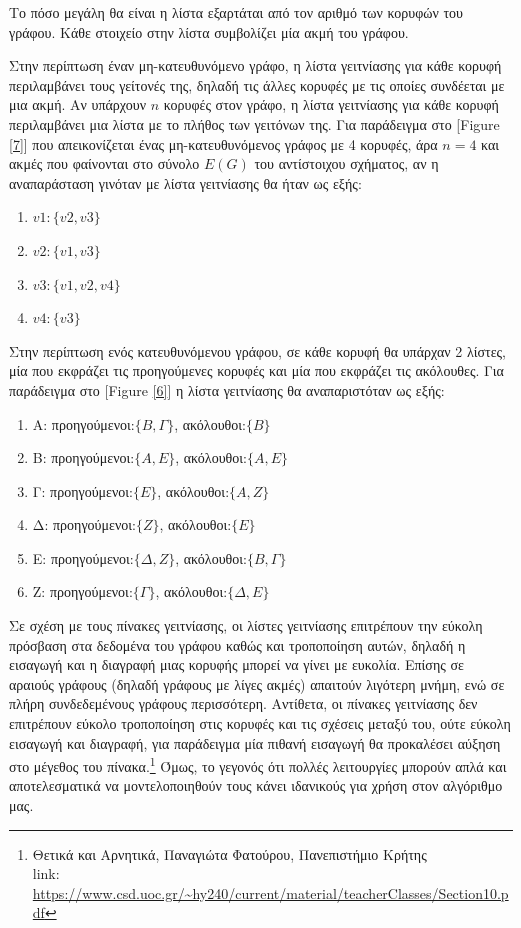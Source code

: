 Το πόσο μεγάλη θα είναι η λίστα εξαρτάται από τον αριθμό των κορυφών του γράφου. Κάθε στοιχείο στην λίστα συμβολίζει μία ακμή του γράφου.
 
Στην περίπτωση έναν μη-κατευθυνόμενο γράφο, η λίστα γειτνίασης για κάθε κορυφή περιλαμβάνει τους γείτονές της, δηλαδή τις άλλες κορυφές με τις οποίες συνδέεται με μια ακμή. Αν υπάρχουν $n$ κορυφές στον γράφο, η λίστα γειτνίασης για κάθε κορυφή περιλαμβάνει μια λίστα με το πλήθος των γειτόνων της. Για παράδειγμα στο [Figure \ref{7}] που απεικονίζεται ένας μη-κατευθυνόμενος γράφος με 4 κορυφές, άρα $n=4$ και ακμές που φαίνονται στο σύνολο $E(G)$ του αντίστοιχου σχήματος, αν η αναπαράσταση γινόταν με λίστα γειτνίασης θα ήταν ως εξής: 
\begin{enumerate}
    \item $v1: \{v2, v3\}$
    \item $v2: \{v1, v3\}$
    \item $v3: \{v1, v2, v4\}$
    \item $v4: \{v3\}$
\end{enumerate}

Στην περίπτωση ενός κατευθυνόμενου γράφου, σε κάθε κορυφή θα υπάρχαν 2 λίστες, μία που εκφράζει τις προηγούμενες κορυφές και μία που εκφράζει τις ακόλουθες. Για παράδειγμα στο [Figure \ref{6}] η λίστα γειτνίασης θα αναπαριστόταν ως εξής: 
\begin{enumerate}
    \item Α: προηγούμενοι:$\{B, Γ\}$, ακόλουθοι:$\{B\}$
    \item Β: προηγούμενοι:$\{A, E\}$, ακόλουθοι:$\{A, E\}$
    \item Γ: προηγούμενοι:$\{E\}$, ακόλουθοι:$\{A, Z\}$
    \item Δ: προηγούμενοι:$\{Z\}$, ακόλουθοι:$\{E\}$
    \item Ε: προηγούμενοι:$\{Δ, Z\}$, ακόλουθοι:$\{B, Γ\}$
    \item Ζ: προηγούμενοι:$\{Γ\}$, ακόλουθοι:$\{Δ, E\}$
    
\end{enumerate}


Σε σχέση με τους πίνακες γειτνίασης, οι λίστες γειτνίασης επιτρέπουν την εύκολη πρόσβαση στα δεδομένα του γράφου καθώς και τροποποίηση αυτών, δηλαδή η εισαγωγή και η διαγραφή μιας κορυφής μπορεί να γίνει με ευκολία. Επίσης σε αραιούς γράφους (δηλαδή γράφους με λίγες ακμές) απαιτούν λιγότερη μνήμη, ενώ σε πλήρη συνδεδεμένους γράφους περισσότερη. 
Αντίθετα, οι πίνακες γειτνίασης δεν επιτρέπουν εύκολο τροποποίηση στις κορυφές και τις σχέσεις μεταξύ του, ούτε εύκολη εισαγωγή και διαγραφή, για παράδειγμα μία πιθανή εισαγωγή θα προκαλέσει αύξηση στο μέγεθος του πίνακα.\footnote{Θετικά και Αρνητικά, Παναγιώτα Φατούρου, Πανεπιστήμιο Κρήτης \\link: \url{https://www.csd.uoc.gr/~hy240/current/material/teacherClasses/Section10.pdf}} Όμως, το γεγονός ότι πολλές λειτουργίες μπορούν απλά και αποτελεσματικά να μοντελοποιηθούν τους κάνει ιδανικούς για χρήση στον αλγόριθμο μας. 
